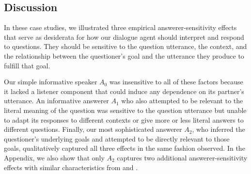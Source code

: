 \documentclass[12pt, floatsintext, jou]{apa6}
\begin{document}
\subsection{Discussion}

In these case studies, we illustrated three empirical answerer-sensitivity effects that serve as desiderata for how our dialogue agent should interpret and respond to questions. They should be sensitive to the question utterance, the context, and the relationship between the questioner's goal and the utterance they produce to fulfill that goal.

Our simple informative speaker $A_0$ was insensitive to all of these factors because it lacked a listener component that could induce any dependence on its partner's utterance. An informative answerer $A_1$ who also attempted to be relevant to the literal meaning of the question was sensitive to the question utterance but unable to adapt its responses to different contexts or give more or less literal answers to different questions. Finally, our most sophisticated answerer $A_2$, who inferred the questioner's underlying goals and attempted to be directly relevant to those goals, qualitatively captured all three effects in the same fashion  observed. In the Appendix, we also show that only $A_2$ captures two additional answerer-sensitivity effects with similar characteristics from  and  .



\end{document}
